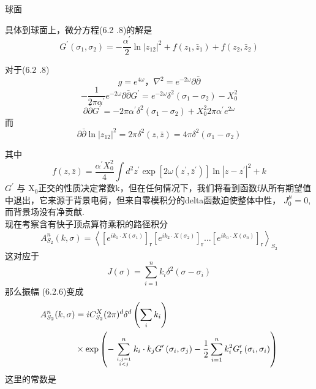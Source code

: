 \centerline{\Large 球面}
具体到球面上，微分方程(6.2 .8)的解是
\begin{equation}
	G^{\prime}\left(\sigma_{1}, \sigma_{2}\right)=-\frac{\alpha^{\prime}}{2} \ln \left|z_{12}\right|^{2}+f\left(z_{1}, \bar{z}_{1}\right)+f\left(z_{2}, \bar{z}_{2}\right)
\end{equation}
\begin{remark}
对于(6.2 .8)
$$
g=e^{4 \omega} ， \nabla^{2}=e^{-2 \omega} \partial \bar{\partial}
$$
$$
-\frac{1}{2 \pi \alpha^{\prime}} e^{-2 \omega} \partial \bar{\partial} G^{\prime}=e^{-2 \omega} \delta^{2}\left(\sigma_{1}-\sigma_{2}\right)-X_{0}^{2}
$$
$$
\partial \bar{\partial} G^{\prime}=-2 \pi \alpha^{\prime} \delta^{2}\left(\sigma_{1}-\sigma_{2}\right)+X_{0}^{2} 2 \pi \alpha^{\prime} e^{2 \omega}
$$
而
$$
\partial \bar{\partial} \ln \left|z_{12}\right|^{2}=2 \pi \delta^{2}(z, \bar{z})=4 \pi \delta^{2}\left(\sigma_{1}-\sigma_{2}\right)
$$	
\end{remark}
其中
\begin{equation}
	f(z, \bar{z})=\frac{\alpha^{\prime} X_{0}^{2}}{4} \int d^{2} z^{\prime} \exp \left[2 \omega\left(z^{\prime}, \bar{z}^{\prime}\right)\right] \ln \left|z-z^{\prime}\right|^{2}+k
\end{equation}
 $G^{\prime}$ 与 $\mathrm{X}_{0}$正交的性质决定常数k，但在任何情况下，我们将看到函数f从所有期望值中退出，它来源于背景电荷，但来自零模积分的delta函数迫使整体中性， $J_{0}^{\mu}=0$, 而背景场没有净贡献.\\
现在考察含有快子顶点算符乘积的路径积分
\begin{equation}
	A_{S_{2}}^{n}(k, \sigma)=\left\langle\left[e^{i k_{1} \cdot X\left(\sigma_{1}\right)}\right]_{\mathrm{r}}\left[e^{i k_{2} \cdot X\left(\sigma_{2}\right)}\right]_{\mathrm{r}} \ldots\left[e^{i k_{n} \cdot X\left(\sigma_{n}\right)}\right]_{\mathrm{r}}\right\rangle_{S_{2}}
\end{equation}
这对应于
\begin{equation}
	J(\sigma)=\sum_{i=1}^{n} k_{i} \delta^{2}\left(\sigma-\sigma_{i}\right)
\end{equation}
那么振幅 (6.2.6)变成
\begin{equation}
	\begin{aligned}
		A_{S_{2}}^{n}(k, \sigma) &=i C_{S_{2}}^{X}(2 \pi)^{d} \delta^{d}\left(\sum_{i} k_{i}\right) \\
		& \times \exp \left(-\sum_{i, j=1 \atop i<j}^{n} k_{i} \cdot k_{j} G^{\prime}\left(\sigma_{i}, \sigma_{j}\right)-\frac{1}{2} \sum_{i=1}^{n} k_{i}^{2} G_{\mathrm{r}}^{\prime}\left(\sigma_{i}, \sigma_{i}\right)\right)
	\end{aligned}
\end{equation}
这里的常数是\footnotemark[1]

